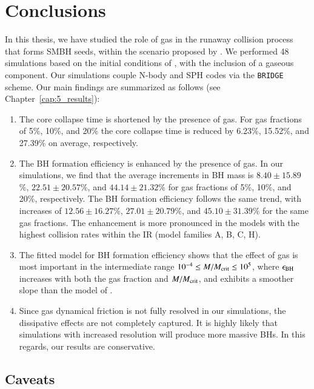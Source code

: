 \chapter{Conclusions}
\label{sec:cap.6_conclusions}

In this thesis, we have studied the role of gas in the runaway collision process that forms SMBH seeds, within the scenario proposed by \citet{escala2021observational}. We performed 48 simulations based on the initial conditions of \citet{vergara2023global}, with the inclusion of a gaseous component. Our simulations couple N-body and SPH codes via the \texttt{BRIDGE} scheme. Our main findings are summarized as follows (see Chapter~\ref{cap:5_results}):

\begin{enumerate}
	\item The core collapse time is shortened by the presence of gas. For gas fractions of 5\%, 10\%, and 20\% the core collapse time is reduced by 6.23\%, 15.52\%, and 27.39\% on average, respectively.
	\item The BH formation efficiency is enhanced by the presence of gas. In our simulations, we find that the average increments in BH mass is $8.40 \pm 15.89$\%, $22.51 \pm 20.57$\%, and $44.14 \pm 21.32$\% for gas fractions of 5\%, 10\%, and 20\%, respectively. The BH formation efficiency follows the same trend, with increases of $12.56 \pm 16.27$\%, $27.01 \pm 20.79$\%, and $45.10 \pm 31.39$\% for the same gas fractions. The enhancement is more pronounced in the models with the highest collision rates within the IR (model families A, B, C, H).
	\item The fitted model for BH formation efficiency shows that the effect of gas is most important in the intermediate range $10^{-4}\leq M/M_{\rm crit}\leq 10^5$, where $\epsilon_{\rm BH}$ increases with both the gas fraction and $M/M_{\rm crit}$, and exhibits a smoother slope than the model of \citet{vergara2023global}.
	\item Since gas dynamical friction is not fully resolved in our simulations, the dissipative effects are not completely captured. It is highly likely that simulations with increased resolution will produce more massive BHs. In this regards, our results are conservative.
\end{enumerate}


\section{Caveats}
\label{sec:caveats}

